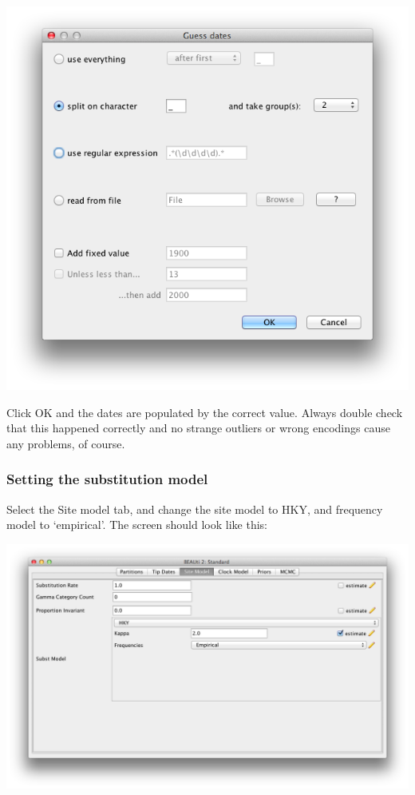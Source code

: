 \documentclass{article}
\begin{document}
\includegraphics[scale=0.4]{figures/BEAUti_dates.png}

Click OK and the dates are populated by the correct value. Always double check that this happened correctly and no strange outliers or wrong encodings cause any problems, of course.

\subsubsection*{Setting the substitution model}

Select the Site model tab, and change the site model to HKY, and frequency model to `empirical'.
The screen should look like this:

\includegraphics[scale=0.4,clip=true,trim=0 300 0 0]{figures/BEAUti_sitemodel.png}
\end{document}
